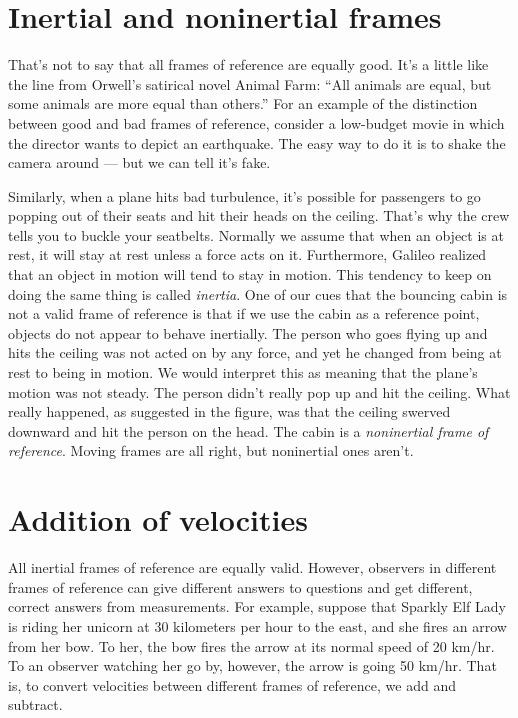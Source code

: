 \section{Inertial and noninertial frames}

That's not to say that all frames of reference are equally good. It's a little like the line from
Orwell's satirical novel Animal Farm: ``All animals are equal, but some animals are more equal than others.''
For an example of the distinction between good and bad frames of reference, consider a low-budget movie in which
the director wants to depict an earthquake.
The easy way to do it is to shake the camera around --- but we can tell it's fake.

\begin{figure}[h]\label{fig:plane-noninertial}
\end{figure}

Similarly, when a plane hits bad turbulence, it's possible for passengers to go popping out of their seats and hit their
heads on the ceiling. That's why the crew tells you to buckle your seatbelts. Normally we assume that when an
object is at rest, it will stay at rest unless a force acts on it. Furthermore, Galileo realized that
an object in motion will tend
to stay in motion. This tendency to keep on doing the same thing is called \emph{inertia}.
One of our cues that the bouncing cabin is not a valid frame of reference is that if we use the cabin as a
reference point, objects do not appear to behave inertially. The person who goes flying up and hits the ceiling
was not acted on by any force, and yet he changed from being at rest to being in motion. We would interpret this
as meaning that the plane's motion was not steady. The person didn't really pop up and hit the ceiling. What really
happened, as suggested in the figure, was that the ceiling swerved downward and hit the person on the head. The cabin is a \emph{noninertial frame
of reference}. Moving frames are all right, but noninertial ones aren't.

\section{Addition of velocities}\label{sec:galilean-velocity-addition}

All inertial frames of reference are equally valid. However, observers in different frames of reference
can give different answers to questions and get different, correct answers from measurements. For example,
suppose that Sparkly Elf Lady is riding her unicorn at 30 kilometers per hour to the east, and she fires
an arrow from her bow. To her, the bow fires the arrow at its normal speed of 20 km/hr. To an observer
watching her go by, however, the arrow is going 50 km/hr. That is, to convert velocities between different
frames of reference, we add and subtract.

